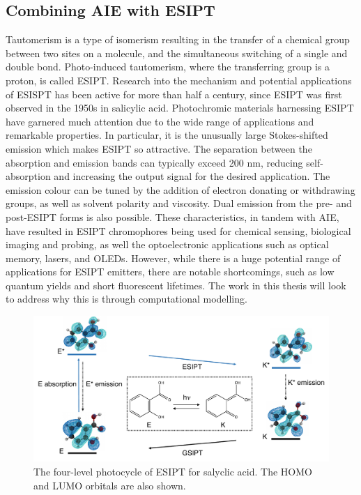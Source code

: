 \subsection{Combining AIE with ESIPT}
Tautomerism is a type of isomerism resulting in the transfer of a chemical group between two sites on a molecule, and the simultaneous switching of a single and double bond. Photo-induced tautomerism, where the transferring group is a proton, is called \acf{ESIPT}. Research into the mechanism and potential applications of ESISPT has been active for more than half a century, since \ac{ESIPT} was first observed in the 1950s in salicylic acid.\cite{Weller1955} Photochromic materials harnessing \ac{ESIPT} have garnered much attention due to the wide range of applications and remarkable properties. In particular, it is the unusually large Stokes-shifted emission which makes \ac{ESIPT} so attractive. The separation between the absorption and emission bands can typically exceed 200 nm, reducing self-absorption and increasing the output signal for the desired application. The emission colour can be tuned by the addition of electron donating or withdrawing groups, as well as solvent polarity and viscosity.\cite{Azarias2016,Yushchenko2007} Dual emission from the pre- and post-\ac{ESIPT} forms is also possible. These characteristics, in tandem with \ac{AIE}, have resulted in \ac{ESIPT} chromophores being used for chemical sensing, biological imaging and probing, as well the optoelectronic applications such as optical memory, lasers, and \acp{OLED}.\cite{Hsieh2010,Kwon2011,Zhao2012,Demchenko2013,Padalkar2015,Chen2018} However, while there is a huge potential range of applications for ESIPT emitters, there are notable shortcomings, such as low quantum yields and short fluorescent lifetimes.\cite{Padalkar2015} The work in this thesis will look to address why this is through computational modelling.
\begin{figure}[t]
\centering
  \includegraphics[width=0.95\linewidth]{1Intro/ESIPT.pdf}
  \caption[The four-level photocycle of ESIPT]{The four-level photocycle of \ac{ESIPT} for salyclic acid. The HOMO and LUMO orbitals are also shown.}
  \label{figure: ESIPT}
\end{figure}
